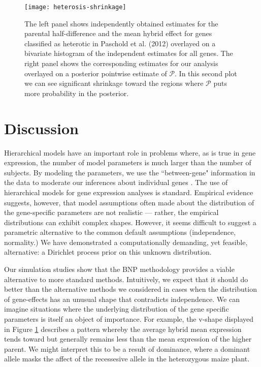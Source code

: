 
\begin{figure}[h!]
\centering
\texttt{[image: heterosis-shrinkage]}
\begin{minipage}{.8\textwidth}
\caption{\small The left panel shows independently obtained estimates for the parental half-difference and the mean hybrid effect for genes classified as heterotic in Paschold et al. (2012) overlayed on a bivariate histogram of the independent estimates for all genes. The right
panel shows the corresponding estimates for our analysis overlayed on a posterior pointwise estimate of $\mathcal{P}$. In this second plot we can see significant shrinkage toward the regions where $\mathcal{P}$ puts more probability in the posterior.}
\end{minipage}
\label{het-shrink}
\end{figure}

\section{Discussion}
Hierarchical models have an important role in problems where, as is true in gene expression, the number of model parameters is much larger than the number of subjects. By modeling the parameters, we use the ``between-gene" information in the data to moderate our inferences about individual genes . The use of hierarchical models for gene expression analyses is standard. Empirical evidence suggests, however, that model assumptions often made about the distribution of the gene-specific parameters are not realistic --- rather, the empirical distributions can exhibit complex shapes. However, it seems difficult to suggest a parametric alternative to the common default assumptions (independence, normality.) We have demonstrated a computationally demanding, yet feasible, alternative: a Dirichlet process prior on this unknown distribution.

Our simulation studies show that the BNP methodology provides a viable alternative to more standard methods. Intuitively, we expect that it should do better than the alternative methods we considered in cases when the distribution of gene-effects has an unusual shape that contradicts independence. We can imagine situations where the underlying distribution of the gene specific parameters is itself an object of importance. For example, the v-shape displayed in Figure \ref{het-shrink} describes a pattern whereby the average hybrid mean expression tends toward but generally remains less than the mean expression of the higher parent. We might interpret this to be a result of dominance, where a dominant allele masks the affect of the recessesive allele in the heterozygous maize plant.

